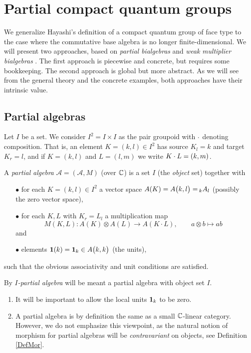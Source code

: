 \section{Partial compact quantum groups}

We generalize Hayashi's definition of a compact quantum group of face type \cite{Hay1} to the case where the commutative base algebra is no longer finite-dimensional. We will present two approaches, based on \emph{partial bialgebras} and \emph{weak multiplier bialgebras} \cite{Boh1,VDW1}. The first approach is piecewise and concrete, but requires some bookkeeping. The second approach is global but more abstract. As we will see from the general theory and the concrete examples, both approaches have their intrinsic value.

\subsection{Partial algebras}

Let $I$ be a set. We consider $I^2=I\times I$ as the pair groupoid with $\wmult$ denoting composition. That is, an element $K=(k,l)\in I^2$ has source $K_l = k$ and target $K_r=l$, and if $K=(k,l)$ and $L=(l,m)$ we write $K\wmult L = (k,m)$. 

\begin{Def} A \emph{partial algebra} $\mathscr{A}=(\mathscr{A},M)$ (over $\C$) is a set $I$ (the \emph{object} set) together with 
\begin{itemize}
\item[$\bullet$] for each $K=(k,l)\in I^2$ a vector space $A(K) = \Grs{A}{k}{l}=\!\!\GrDA{A}{k}{l}$ (possibly the zero vector space),
\item[$\bullet$] for each $K,L$ with $K_r = L_l$ a multiplication map \[M(K,L):A(K) \otimes A(L)\rightarrow A(K\cdot L),\qquad a\otimes b \mapsto ab\]  and 
\item[$\bullet$] elements $\Unit(k) = \Unit_k \in \Grs{A}{k}{k}$ (the units), %
\end{itemize}
such that the obvious associativity and unit conditions are satisfied. 

By \emph{$I$-partial algebra} will be meant a partial algebra with object set $I$.
\end{Def}


\begin{Rem}
\begin{enumerate}\item It will be important to allow the local units $\Unit_k$ to be zero.
\item A partial algebra is by definition the same as a small $\C$-linear category. However, we do not emphasize this viewpoint, as the natural notion of morphism for partial algebras will be \emph{contravariant} on objects, see Definition \ref{DefMor}.%
\end{enumerate}
\end{Rem}

